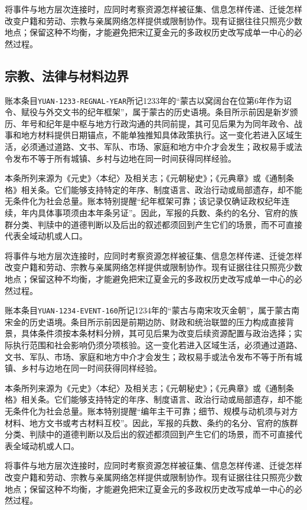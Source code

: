 将事件与地方层次连接时，应同时考察资源怎样被征集、信息怎样传递、迁徙怎样改变户籍和劳动、宗教与亲属网络怎样提供或限制协作。现有证据往往只照亮少数地点；保留这种不均衡，才能避免把宋辽夏金元的多政权历史改写成单一中心的必然过程。

\subsection{宗教、法律与材料边界}

账本条目\texttt{YUAN-1233-REGNAL-YEAR}所记1233年的“蒙古以窝阔台在位第6年作为诏令、赋役与外交文书的纪年框架”，属于蒙古的历史语境。条目所示前因是新岁颁历、年号和纪年是中枢与地方行政沟通的共同前提，其可见后果为为同年政令、战事和地方材料提供日期锚点，不能单独推知具体政策执行。这一变化若进入区域生活，必须通过道路、文书、军队、市场、家庭和地方中介才会发生；政权易手或法令发布不等于所有城镇、乡村与边地在同一时间获得同样经验。

本条所列来源为《元史》〈本纪〉及相关志；《元朝秘史》；《元典章》或《通制条格》相关条。它们能够支持特定的年序、制度语言、政治行动或局部遗存，却不能无条件化为社会总量。账本特别提醒“纪年框架可靠；该记录仅确证政权纪年连续，年内具体事项须由本年条另证”。因此，军报的兵数、条约的名分、官府的族群分类、判牍中的道德判断以及后出的叙述都须回到产生它们的场景，而不可直接代表全域动机或人口。

将事件与地方层次连接时，应同时考察资源怎样被征集、信息怎样传递、迁徙怎样改变户籍和劳动、宗教与亲属网络怎样提供或限制协作。现有证据往往只照亮少数地点；保留这种不均衡，才能避免把宋辽夏金元的多政权历史改写成单一中心的必然过程。

账本条目\texttt{YUAN-1234-EVENT-160}所记1234年的“蒙古与南宋攻灭金朝”，属于蒙古南宋金的历史语境。条目所示前因是前期边防、财政和统治联盟的压力构成直接背景，具体条件须按本条材料分辨，其可见后果为改变后续资源配置与政治选择；实际执行范围和社会影响仍须分项核验。这一变化若进入区域生活，必须通过道路、文书、军队、市场、家庭和地方中介才会发生；政权易手或法令发布不等于所有城镇、乡村与边地在同一时间获得同样经验。

本条所列来源为《元史》〈本纪〉及相关志；《元朝秘史》；《元典章》或《通制条格》相关条。它们能够支持特定的年序、制度语言、政治行动或局部遗存，却不能无条件化为社会总量。账本特别提醒“编年主干可靠；细节、规模与动机须与对方材料、地方文书或考古材料互校”。因此，军报的兵数、条约的名分、官府的族群分类、判牍中的道德判断以及后出的叙述都须回到产生它们的场景，而不可直接代表全域动机或人口。

将事件与地方层次连接时，应同时考察资源怎样被征集、信息怎样传递、迁徙怎样改变户籍和劳动、宗教与亲属网络怎样提供或限制协作。现有证据往往只照亮少数地点；保留这种不均衡，才能避免把宋辽夏金元的多政权历史改写成单一中心的必然过程。

